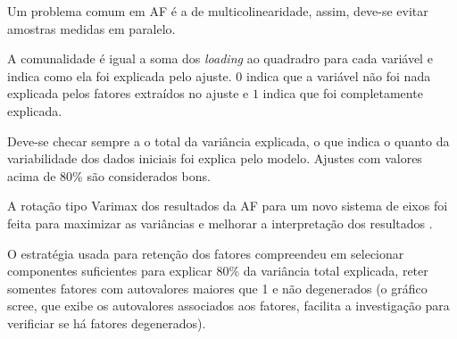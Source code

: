 Um problema comum em AF é a de multicolinearidade, assim, 
deve-se evitar amostras medidas em paralelo. 

A comunalidade é igual a soma dos \textit{loading} ao quadradro 
para cada variável e indica como ela foi explicada pelo ajuste. 
$0$ indica que a variável não foi nada explicada pelos fatores extraídos 
no ajuste e $1$ indica que foi completamente explicada.

Deve-se checar sempre a o total da variância explicada, o que indica 
o quanto da variabilidade dos dados iniciais foi explica pelo modelo. 
Ajustes com valores acima de 80\% são considerados bons. 

A rotação tipo Varimax dos resultados da AF 
para um novo sistema de eixos foi feita para maximizar as variâncias 
e melhorar a interpretação dos resultados \citep{kaiser1958}.

O estratégia usada para retenção dos fatores compreendeu em selecionar 
componentes suficientes para explicar 80\% da variância total explicada, 
reter somentes fatores com autovalores maiores que 1 e não degenerados 
(o gráfico scree, que 
exibe os autovalores associados aos fatores, facilita a investigação para 
verificiar se há fatores degenerados). 







